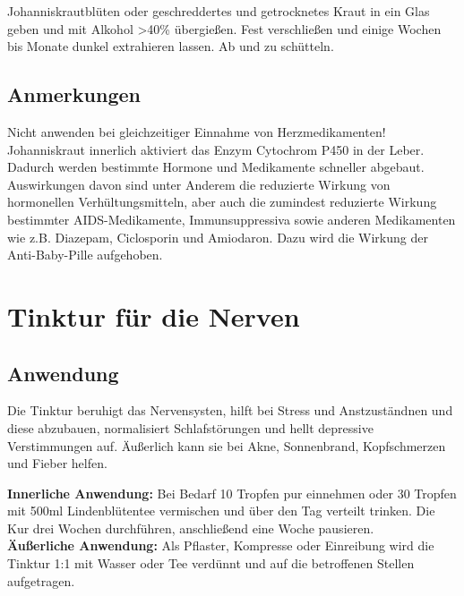 Johanniskrautblüten oder geschreddertes und getrocknetes Kraut in ein Glas geben und mit Alkohol >40\% übergießen. Fest verschließen und einige Wochen bis Monate dunkel extrahieren lassen. Ab und zu schütteln.

\subsection{Anmerkungen}

Nicht anwenden bei gleichzeitiger Einnahme von Herzmedikamenten! Johanniskraut innerlich aktiviert das Enzym Cytochrom P450 in der Leber. Dadurch werden bestimmte Hormone und Medikamente schneller abgebaut. Auswirkungen davon sind unter Anderem die reduzierte Wirkung von hormonellen Verhültungsmitteln, aber auch die zumindest reduzierte Wirkung bestimmter AIDS-Medikamente, Immunsuppressiva sowie anderen Medikamenten wie z.B. Diazepam, Ciclosporin und Amiodaron. Dazu wird die Wirkung der Anti-Baby-Pille aufgehoben.






\section{Tinktur für die Nerven}

\cite{nedoma2018heiltinkturen}

         

\subsection{Anwendung}

Die Tinktur beruhigt das Nervensysten, hilft bei Stress und Anstzuständnen und diese abzubauen, normalisiert Schlafstörungen und hellt depressive Verstimmungen auf. Äußerlich  kann sie bei Akne, Sonnenbrand, Kopfschmerzen und Fieber helfen.

\textbf{Innerliche Anwendung:} Bei Bedarf 10 Tropfen pur einnehmen oder 30 Tropfen mit 500ml Lindenblütentee vermischen und über den Tag verteilt trinken. Die Kur drei Wochen durchführen, anschließend eine Woche pausieren.\\ 

\textbf{Äußerliche Anwendung:} Als Pflaster, Kompresse oder Einreibung wird die Tinktur 1:1 mit Wasser oder Tee verdünnt und auf die betroffenen Stellen aufgetragen.\\

